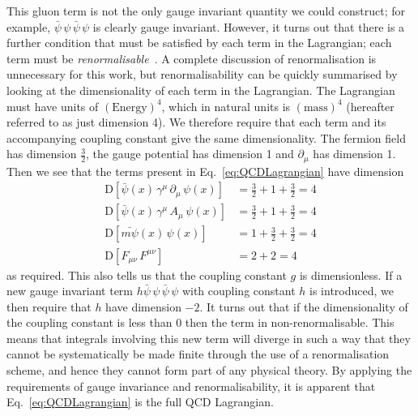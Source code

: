 This gluon term is not the only gauge invariant quantity we could construct; for example, $\bar{\psi}\,\psi\,\bar{\psi}\,\psi$ is clearly gauge invariant. However, it turns out that there is a further condition that must be satisfied by each term in the Lagrangian; each term must be \textit{renormalisable}~\cite{peskin2018introduction}. A complete discussion of renormalisation is unnecessary for this work, but renormalisability can be quickly summarised by looking at the dimensionality of each term in the Lagrangian. The Lagrangian must have units of $(\text{Energy})^4$, which in natural units is $(\text{mass})^4$ (hereafter referred to as just dimension 4). We therefore require that each term and its accompanying coupling constant give the same dimensionality. The fermion field has dimension $\frac{3}{2}$, the gauge potential has dimension 1 and $\partial_\mu$ has dimension 1. Then we see that the terms present in Eq.~\ref{eq:QCDLagrangian} have dimension
%
\begin{align*}
\text{D}[\bar{\psi}(x)\,\gamma^\mu\,\partial_\mu\,\psi(x)]&=\frac{3}{2}+1+\frac{3}{2}=4\\
\text{D}[\bar{\psi}(x)\,\gamma^\mu\,A_\mu\,\psi(x)]&=\frac{3}{2}+1+\frac{3}{2}=4\\
\text{D}[\bar{m\psi}(x)\,\psi(x)]&=1+\frac{3}{2}+\frac{3}{2}=4\\
\text{D}[F_{\mu\nu}\,F^{\mu\nu}] &= 2+2=4
\end{align*}
%
as required. This also tells us that the coupling constant $g$ is dimensionless. If a new gauge invariant term $h\bar{\psi}\,\psi\,\bar{\psi}\,\psi$ with coupling constant $h$ is introduced, we then require that $h$ have dimension $-2$. It turns out that if the dimensionality of the coupling constant is less than 0 then the term in non-renormalisable. This means that integrals involving this new term will diverge in such a way that they cannot be systematically be made finite through the use of a renormalisation scheme, and hence they cannot form part of any physical theory. By applying the requirements of gauge invariance and renormalisability, it is apparent that Eq.~\ref{eq:QCDLagrangian} is the full QCD Lagrangian.

